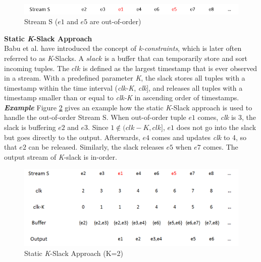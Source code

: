 \documentclass[a4paper, 11pt, twoside]{report}
\begin{document}
\begin{figure}[h]
\centering
\includegraphics[width=5in]{input}
\caption{Stream S ($e1$ and $e5$ are out-of-order)\label{fig:input}}
\end{figure}

\label{subsec:buffer based approaches}

\noindent\textbf{Static \textit{K}-Slack Approach}\\

Babu et al. \cite{Babu:2004:EKC:1016028.1016032} have introduced the concept of \textit{k-constraints}, which is later often referred to as \textit{K}-Slacks. A $slack$ is a buffer that can temporarily store and sort incoming tuples. The $clk$ is defined as the largest timestamp that is ever observed in a stream. With a predefined parameter \textit{K}, the slack stores all tuples with a timestamp within the time interval (\textit{clk-K}, \textit{clk}], and releases all tuples with a timestamp smaller than or equal to \textit{clk-K} in ascending order of timestamps. \\

\noindent\textbf{\textit{Example}} Figure \ref{fig:statik-k-slack-example} gives an example how the static \textit{K}-Slack approach is used to handle the out-of-order Stream S. When out-of-order tuple $e1$ comes, \textit{clk} is 3, the slack is buffering $e2$ and $e3$. Since $1\not\in(clk-K, clk]$, $e1$ does not go into the slack but goes directly to the output. Afterwards, $e4$ comes and updates \textit{clk} to 4, so that $e2$ can be released. Similarly, the slack releases $e5$ when $e7$ comes. The output stream of \textit{K}-slack is in-order.\\

\begin{figure}[h]
\centering
\includegraphics[width=5in]{statik-k-slack-example}
\caption{Static \textit{K}-Slack Approach (K=2) \label{fig:statik-k-slack-example}}
\end{figure}
\end{document}

